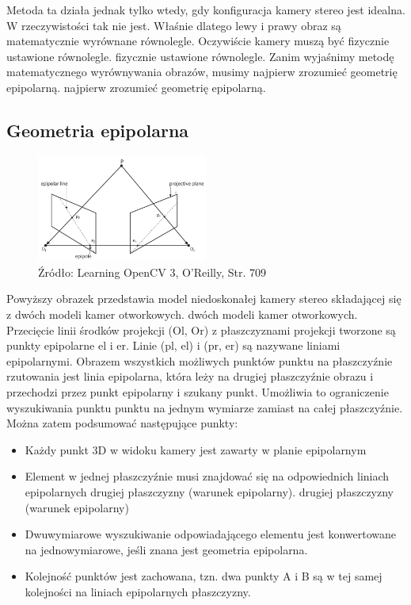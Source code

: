 \documentclass[magisterska]{pracadypl}
\begin{document}
Metoda ta działa jednak tylko wtedy, gdy konfiguracja kamery stereo jest idealna. W
rzeczywistości tak nie jest. Właśnie dlatego lewy i prawy obraz są
matematycznie wyrównane równolegle. Oczywiście kamery muszą być fizycznie ustawione równolegle.
fizycznie ustawione równolegle.
Zanim wyjaśnimy metodę matematycznego wyrównywania obrazów, musimy najpierw zrozumieć geometrię epipolarną.
najpierw zrozumieć geometrię epipolarną.

\subsection{Geometria epipolarna}

\begin{figure}[h]  %
    \centering  %
    \includegraphics[width=0.5\textwidth]{images/epipolar.png}  %
    \captionsetup{labelformat=empty, font=footnotesize}
    \caption{Źródło: Learning OpenCV 3, O'Reilly, Str. 709}
    \label{fig:rpi}  %
\end{figure}

Powyższy obrazek przedstawia model niedoskonałej kamery stereo składającej się z dwóch modeli kamer otworkowych.
dwóch modeli kamer otworkowych. Przecięcie linii środków projekcji
(Ol, Or) z płaszczyznami projekcji tworzone są punkty epipolarne el i er. Linie (pl,
el) i (pr, er) są nazywane liniami epipolarnymi. Obrazem wszystkich możliwych punktów punktu
na płaszczyźnie rzutowania jest linia epipolarna, która leży na drugiej płaszczyźnie obrazu i
przechodzi przez punkt epipolarny i szukany punkt. Umożliwia to ograniczenie wyszukiwania punktu
punktu na jednym wymiarze zamiast na całej płaszczyźnie.
Można zatem podsumować następujące punkty:

\begin{itemize}
  \item Każdy punkt 3D w widoku kamery jest zawarty w planie epipolarnym
  \item Element w jednej płaszczyźnie musi znajdować się na odpowiednich liniach epipolarnych drugiej płaszczyzny (warunek epipolarny).
drugiej płaszczyzny (warunek epipolarny)
  \item Dwuwymiarowe wyszukiwanie odpowiadającego elementu jest konwertowane na
jednowymiarowe, jeśli znana jest geometria epipolarna.
  \item Kolejność punktów jest zachowana, tzn. dwa punkty A i B są w tej samej kolejności na liniach epipolarnych płaszczyzny.

\end{itemize}
\end{document}
